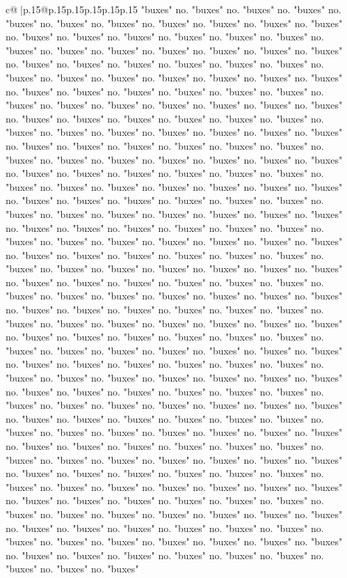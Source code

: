 \documentclass{article}
\begin{document}
{\begin{supertabular}{c@{$\;$}|p{.15\linewidth}@{}p{.15\linewidth}p{.15\linewidth}p{.15\linewidth}p{.15\linewidth}p{.15\linewidth}}
{{{"buxes" no. "buxes" no. "buxes" no. "buxes" no. "buxes" no. "buxes" no. "buxes" no. "buxes" no. "buxes" no. "buxes" no. "buxes" no. "buxes" no. "buxes" no. "buxes" no. "buxes" no. "buxes" no. "buxes" no. "buxes" no. "buxes" no. "buxes" no. "buxes" no. "buxes" no. "buxes" no. "buxes" no. "buxes" no. "buxes" no. "buxes" no. "buxes" no. "buxes" no. "buxes" no. "buxes" no. "buxes" no. "buxes" no. "buxes" no. "buxes" no. "buxes" no. "buxes" no. "buxes" no. "buxes" no. "buxes" no. "buxes" no. "buxes" no. "buxes" no. "buxes" no. "buxes" no. "buxes" no. "buxes" no. "buxes" no. "buxes" no. "buxes" no. "buxes" no. "buxes" no. "buxes" no. "buxes" no. "buxes" no. "buxes" no. "buxes" no. "buxes" no. "buxes" no. "buxes" no. "buxes" no. "buxes" no. "buxes" no. "buxes" no. "buxes" no. "buxes" no. "buxes" no. "buxes" no. "buxes" no. "buxes" no. "buxes" no. "buxes" no. "buxes" no. "buxes" no. "buxes" no. "buxes" no. "buxes" no. "buxes" no. "buxes" no. "buxes" no. "buxes" no. "buxes" no. "buxes" no. "buxes" no. "buxes" no. "buxes" no. "buxes" no. "buxes" no. "buxes" no. "buxes" no. "buxes" no. "buxes" no. "buxes" no. "buxes" no. "buxes" no. "buxes" no. "buxes" no. "buxes" no. "buxes" no. "buxes" no. "buxes" no. "buxes" no. "buxes" no. "buxes" no. "buxes" no. "buxes" no. "buxes" no. "buxes" no. "buxes" no. "buxes" no. "buxes" no. "buxes" no. "buxes" no. "buxes" no. "buxes" no. "buxes" no. "buxes" no. "buxes" no. "buxes" no. "buxes" no. "buxes" no. "buxes" no. "buxes" no. "buxes" no. "buxes" no. "buxes" no. "buxes" no. "buxes" no. "buxes" no. "buxes" no. "buxes" no. "buxes" no. "buxes" no. "buxes" no. "buxes" no. "buxes" no. "buxes" no. "buxes" no. "buxes" no. "buxes" no. "buxes" no. "buxes" no. "buxes" no. "buxes" no. "buxes" no. "buxes" no. "buxes" no. "buxes" no. "buxes" no. "buxes" no. "buxes" no. "buxes" no. "buxes" no. "buxes" no. "buxes" no. "buxes" no. "buxes" no. "buxes" no. "buxes" no. "buxes" no. "buxes" no. "buxes" no. "buxes" no. "buxes" no. "buxes" no. "buxes" no. "buxes" no. "buxes" no. "buxes" no. "buxes" no. "buxes" no. "buxes" no. "buxes" no. "buxes" no. "buxes" no. "buxes" no. "buxes" no. "buxes" no. "buxes" no. "buxes" no. "buxes" no. "buxes" no. "buxes" no. "buxes" no. "buxes" no. "buxes" no. "buxes" no. "buxes" no. "buxes" no. "buxes" no. "buxes" no. "buxes" no. "buxes" no. "buxes" no. "buxes" no. "buxes" no. "buxes" no. "buxes" no. "buxes" no. "buxes" no. "buxes" no. "buxes" no. "buxes" no. "buxes" no. "buxes" no. "buxes" no. "buxes" no. "buxes" no. "buxes" no. "buxes" no. "buxes" no. "buxes" no. "buxes" no. "buxes" no. "buxes" no. "buxes" no. "buxes" no. "buxes" no. "buxes" no. "buxes" no. "buxes" no. "buxes" no. "buxes" no. "buxes" no. "buxes" no. "buxes" no. "buxes" no. "buxes" no. "buxes" no. "buxes" no. "buxes" no. "buxes" no. "buxes" no. "buxes" no. "buxes" no. "buxes" no. "buxes" no. "buxes" no. "buxes" no. "buxes" no. "buxes" no. "buxes" no. "buxes" no. "buxes" no. "buxes" no. "buxes" no. "buxes" no. "buxes" no. "buxes" no. "buxes" no. "buxes" no. "buxes" no. "buxes" no. "buxes" no. "buxes" no. "buxes" no. "buxes" no. "buxes" no. "buxes" no. "buxes" no. "buxes" no. "buxes" no. "buxes" no. "buxes" no. "buxes" no. "buxes" no. "buxes" }}}
\end{supertabular}}
\end{document}
